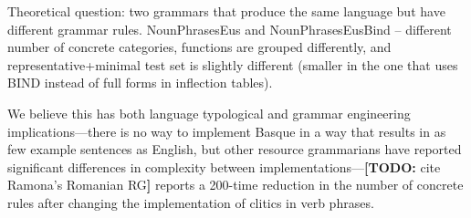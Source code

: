\documentclass[11pt]{article}
\newcommand{\todo}[1]{{\color{cyan}\textbf{[TODO: }#1\textbf{]}}}
\begin{document}
Theoretical question: two grammars that produce the same language but
have different grammar rules.
NounPhrasesEus and NounPhrasesEusBind -- different number of concrete
categories, functions are grouped differently, and
representative+minimal test set is slightly different (smaller in the
one that uses BIND instead of full forms in inflection tables).

We believe this has both language typological and grammar engineering
implications---there is no way to implement Basque in a way that
results in as few example sentences as English, but other resource
grammarians have reported significant differences in complexity
between implementations---\todo{cite Ramona's Romanian RG} reports a
200-time reduction in the number of concrete rules after changing the
implementation of clitics in verb phrases.






\end{document}
